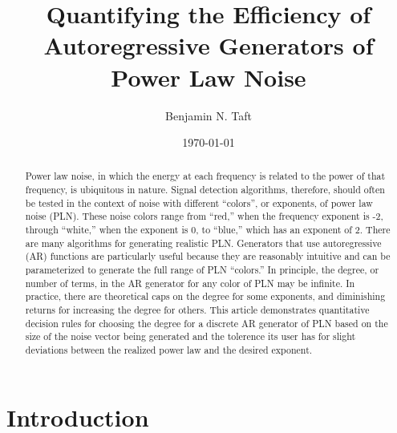 \documentclass[preprint]{JASA}
\begin{document}

\title[Efficiently Generating AR Power Law Noise]
{Quantifying the Efficiency of Autoregressive Generators of Power Law Noise}

\author{Benjamin N. Taft}



\date{\today} 

\begin{abstract}
  Power law noise, in which the energy at each frequency is related to the   power of that frequency, is ubiquitous in nature.
  Signal detection algorithms, therefore, should often be tested in the context   of noise with different ``colors'', or exponents, of power law noise (PLN).
  These noise colors range from ``red,'' when the frequency exponent is -2,   through ``white,'' when the exponent is 0, to ``blue,'' which has an exponent  of 2.
  There are many algorithms for generating realistic PLN.
  Generators that use autoregressive (AR) functions are particularly useful because they are reasonably intuitive and can be parameterized to generate the full range of PLN ``colors.''
  In principle, the degree, or number of terms, in the AR generator for any color of PLN may be infinite.
  In practice, there are theoretical caps on the degree for some exponents, and diminishing returns for increasing the degree for others.
  This article demonstrates quantitative decision rules for choosing the degree for a discrete AR generator of PLN based on the size of the noise vector
  being generated and the tolerence its user has for slight deviations between the realized power law and the desired exponent.
\end{abstract}

\maketitle

\section{Introduction}
\end{document}
